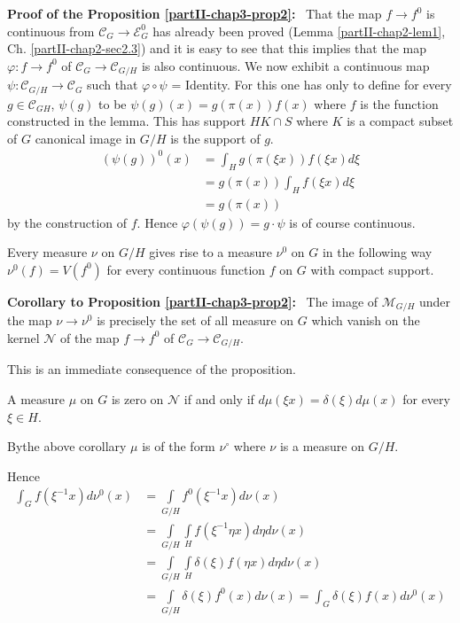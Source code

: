 \medskip
\noindent
{\bf Proof of the Proposition \ref{partII-chap3-prop2}:}~
That the map $f \rightarrow f^0$ is continuous from $\mathscr{C}_{G}
\rightarrow \mathscr{E}^0_{G}$ has already been proved (Lemma
\ref{partII-chap2-lem1}, 
Ch. \ref{partII-chap2-sec2.3}) and it is easy to see that this implies
that the map 
$\varphi : f\rightarrow f^0$  of $\mathscr{C}_{G} \rightarrow
\mathscr{C}_{G/H}$ is also continuous. We now exhibit a continuous map
$\psi : \mathscr{C}_{G/H} \rightarrow \mathscr{C}_{G}$ such that
$\varphi \circ \psi$ = Identity. For this one has only to define for
every $g \in \mathscr{C}_{GH}$, $\psi(g)$ to be $\psi(g)(x)= g
(\pi(x)) f(x)$ where $f$ is the function constructed in the
lemma. This has support $H K\cap S$ where $K$ is a compact subset of
$G$ canonical image in $G/H$ is the support of $g$. 
  \begin{align*}
 (\psi(g))^0(x) &= \int_{H} g(\pi(\xi x)) f(\xi x) d \xi\\
 & = g(\pi(x)) \int_{H} f(\xi x) d \xi\\
  & =g(\pi(x))
 \end{align*}
by the construction of $f$. Hence $\varphi(\psi(g)) = g\cdot \psi$ is of
course continuous.  
 
Every measure $\nu$ on $G/H$ gives rise to a measure $\nu^0$ on $G$ in
the following way $\nu^{0} (f) = V(f^{0})$ for every continuous
function $f$ on $G$ with compact support. 
 
\medskip
\noindent
{\bf Corollary to Proposition \ref{partII-chap3-prop2}:}~
 The image of $\mathscr{M}_{G/H}$ under the map $\nu \rightarrow
 \nu^{0}$ is precisely the set of all measure on $G$ which vanish on
 the kernel $\mathscr{N}$ of the map $f \rightarrow f^{0}$ of $\mathscr{C}_{G}
 \rightarrow \mathscr{C}_{G/H}$. 

This is an immediate consequence of the proposition.
 
\begin{proposition}\label{partII-chap3-prop3}%
 A measure $\mu$ on $G$ is zero on $\mathscr{N}$ if and only if $d \mu(\xi x) =
 \delta (\xi) d \mu(x)$ for every $\xi \in H$. 
\end{proposition}

By\pageoriginale the above corollary $\mu$ is of the form $\nu^\circ$
where $\nu$ is a measure on $G/H$. 

Hence
\begin{align*}
\int_G f(\xi^{-1} x) d\nu^0 (x)& =\int\limits_{G/H} f^0 (
\xi^{-1} x) d \nu (x) \\ 
&=\int\limits_{G/H}\int\limits_{H} f( \xi^{-1}\eta x) d \eta d \nu (x)\\
&= \int\limits_{G/H} \int\limits_{H} \delta ( \xi ) f (\eta x ) d \eta
d \nu (x)\\ 
&=\int\limits_{G/H}\delta ( \xi )f^0 (x) d \nu (x) =
\int_{G}\delta (\xi) f(x) d\nu^0 (x) 
\end{align*}

